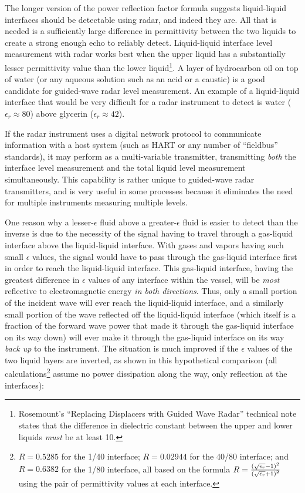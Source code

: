 \vskip 10pt

The longer version of the power reflection factor formula suggests liquid-liquid interfaces should be detectable using radar, and indeed they are.  All that is needed is a sufficiently large difference in permittivity between the two liquids to create a strong enough echo to reliably detect.  Liquid-liquid interface level measurement with radar works best when the upper liquid has a substantially lesser permittivity value than the lower liquid\footnote{Rosemount's ``Replacing Displacers with Guided Wave Radar'' technical note states that the difference in dielectric constant between the upper and lower liquids \textit{must} be at least 10.}.  A layer of hydrocarbon oil on top of water (or any aqueous solution such as an acid or a caustic) is a good candidate for guided-wave radar level measurement.  An example of a liquid-liquid interface that would be very difficult for a radar instrument to detect is water ($\epsilon_r \approx 80$) above glycerin ($\epsilon_r \approx 42$).  

If the radar instrument uses a digital network protocol to communicate information with a host system (such as HART or any number of ``fieldbus'' standards), it may perform as a multi-variable transmitter, transmitting \textit{both} the interface level measurement and the total liquid level measurement simultaneously.  This capability is rather unique to guided-wave radar transmitters, and is very useful in some processes because it eliminates the need for multiple instruments measuring multiple levels.     

One reason why a lesser-$\epsilon$ fluid above a greater-$\epsilon$ fluid is easier to detect than the inverse is due to the necessity of the signal having to travel through a gas-liquid interface above the liquid-liquid interface.  With gases and vapors having such small $\epsilon$ values, the signal would have to pass through the gas-liquid interface first in order to reach the liquid-liquid interface.  This gas-liquid interface, having the greatest difference in $\epsilon$ values of any interface within the vessel, will be \textit{most} reflective to electromagnetic energy \textit{in both directions}.  Thus, only a small portion of the incident wave will ever reach the liquid-liquid interface, and a similarly small portion of the wave reflected off the liquid-liquid interface (which itself is a fraction of the forward wave power that made it through the gas-liquid interface on its way down) will ever make it through the gas-liquid interface on its way \textit{back up} to the instrument.  The situation is much improved if the $\epsilon$ values of the two liquid layers are inverted, as shown in this hypothetical comparison (all calculations\footnote{$R = 0.5285$ for the 1/40 interface; $R = 0.02944$ for the 40/80 interface; and $R = 0.6382$ for the 1/80 interface, all based on the formula $R = {\left({\sqrt{\epsilon_{r}} - 1}\right)^2 \over \left(\sqrt{\epsilon_{r}} + 1 \right)^2}$ using the pair of permittivity values at each interface.} assume no power dissipation along the way, only reflection at the interfaces):

